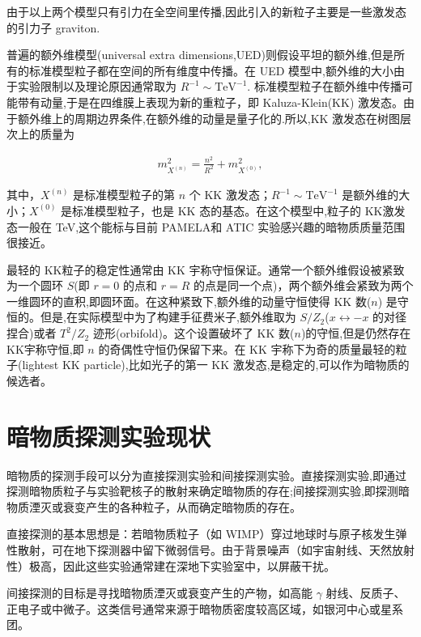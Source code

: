 \documentclass{beamer} %
\begin{document}
\begin{frame}
由于以上两个模型只有引力在全空间里传播,因此引入的新粒子主要是一些激发态的引力子 graviton.

普遍的额外维模型(universal extra dimensions,UED)则假设平坦的额外维,但是所有的标准模型粒子都在空间的所有维度中传播。在 UED 模型中,额外维的大小由于实验限制以及理论原因通常取为 $R^{-1} \sim \mathrm{TeV}^{-1} .$ 标准模型粒子在额外维中传播可能带有动量,于是在四维膜上表现为新的重粒子，即 Kaluza-Klein(KK) 激发态。由于额外维上的周期边界条件,在额外维的动量是量子化的.所以,KK 激发态在树图层次上的质量为

\begin{align}
m_{X^{(n)}}^2
=\frac{n^2 }{R^2 } + m_{X^{(0)}}^2,
\end{align}

其中，$X^{(n)} $ 是标准模型粒子的第 $n$ 个 KK 激发态；$R^{-1}\sim \mathrm{TeV}^{-1} $ 是额外维的大小；$X^{(0)}$ 是标准模型粒子，也是 KK 态的基态。在这个模型中,粒子的 KK激发态一般在 TeV,这个能标与目前 PAMELA和 ATIC 实验感兴趣的暗物质质量范围很接近。
\end{frame}

\begin{frame}
最轻的 KK粒子的稳定性通常由 KK 宇称守恒保证。通常一个额外维假设被紧致为一个圆环 $S$(即 $r=0$ 的点和 $r=R$ 的点是同一个点)，两个额外维会紧致为两个一维圆环的直积,即圆环面。在这种紧致下,额外维的动量守恒使得 KK 数($n$) 是守恒的。但是,在实际模型中为了构建手征费米子,额外维取为 $S/Z_2$($x\leftrightarrow -x$ 的对径捏合)或者 $T^2/Z_2$ 迹形(orbifold)。这个设置破坏了 KK 数($n$)的守恒,但是仍然存在 KK宇称守恒,即 $n$ 的奇偶性守恒仍保留下来。在 KK 宇称下为奇的质量最轻的粒子(lightest KK particle),比如光子的第一 KK 激发态,是稳定的,可以作为暗物质的候选者。
\end{frame}

\section{暗物质探测实验现状}

\begin{frame}
暗物质的探测手段可以分为直接探测实验和间接探测实验。直接探测实验,即通过探测暗物质粒子与实验靶核子的散射来确定暗物质的存在;间接探测实验,即探测暗物质湮灭或衰变产生的各种粒子，从而确定暗物质的存在。

直接探测的基本思想是：若暗物质粒子（如 WIMP）穿过地球时与原子核发生弹性散射，可在地下探测器中留下微弱信号。由于背景噪声（如宇宙射线、天然放射性）极高，因此这些实验通常建在深地下实验室中，以屏蔽干扰。

间接探测的目标是寻找暗物质湮灭或衰变产生的产物，如高能 $\gamma$ 射线、反质子、正电子或中微子。这类信号通常来源于暗物质密度较高区域，如银河中心或星系团。
\end{frame}
\end{document}
